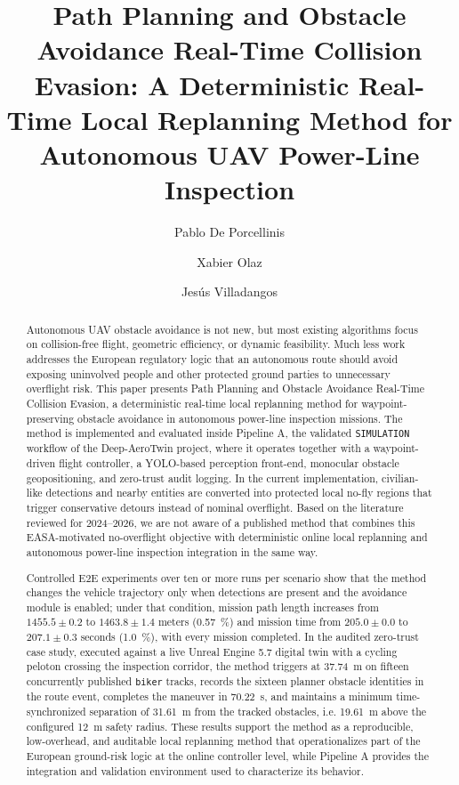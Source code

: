 \documentclass[a4paper,11pt]{article}
\title{Path Planning and Obstacle Avoidance Real-Time Collision Evasion: A Deterministic Real-Time Local Replanning Method for Autonomous UAV Power-Line Inspection}
\author[1,2]{Pablo De Porcellinis}
\author[1]{Xabier Olaz}
\author[1,3]{Jes\'us Villadangos}
\affil[1]{Mathematical Engineering and Computer Science Department, Public University of Navarre, Spain}
\affil[2]{FuVeX Civil SL, Spain}
\affil[3]{Institute of Smart Cities, Public University of Navarre, Spain}
\date{}
\begin{document}
\maketitle

\begin{abstract}
Autonomous UAV obstacle avoidance is not new, but most existing algorithms focus on collision-free flight, geometric efficiency, or dynamic feasibility. Much less work addresses the European regulatory logic that an autonomous route should avoid exposing uninvolved people and other protected ground parties to unnecessary overflight risk. This paper presents Path Planning and Obstacle Avoidance Real-Time Collision Evasion, a deterministic real-time local replanning method for waypoint-preserving obstacle avoidance in autonomous power-line inspection missions. The method is implemented and evaluated inside Pipeline A, the validated \texttt{SIMULATION} workflow of the Deep-AeroTwin project, where it operates together with a waypoint-driven flight controller, a YOLO-based perception front-end, monocular obstacle geopositioning, and zero-trust audit logging. In the current implementation, civilian-like detections and nearby entities are converted into protected local no-fly regions that trigger conservative detours instead of nominal overflight. Based on the literature reviewed for 2024--2026, we are not aware of a published method that combines this EASA-motivated no-overflight objective with deterministic online local replanning and autonomous power-line inspection integration in the same way.

Controlled E2E experiments over ten or more runs per scenario show that the method changes the vehicle trajectory only when detections are present and the avoidance module is enabled; under that condition, mission path length increases from $1455.5 \pm 0.2$ to $1463.8 \pm 1.4$ meters (\SI{0.57}{\percent}) and mission time from $205.0 \pm 0.0$ to $207.1 \pm 0.3$ seconds (\SI{1.0}{\percent}), with every mission completed. In the audited zero-trust case study, executed against a live Unreal Engine 5.7 digital twin with a cycling peloton crossing the inspection corridor, the method triggers at \SI{37.74}{\meter} on fifteen concurrently published \texttt{biker} tracks, records the sixteen planner obstacle identities in the route event, completes the maneuver in \SI{70.22}{\second}, and maintains a minimum time-synchronized separation of \SI{31.61}{\meter} from the tracked obstacles, i.e. \SI{19.61}{\meter} above the configured \SI{12}{\meter} safety radius. These results support the method as a reproducible, low-overhead, and auditable local replanning method that operationalizes part of the European ground-risk logic at the online controller level, while Pipeline A provides the integration and validation environment used to characterize its behavior.
\end{abstract}
\end{document}

